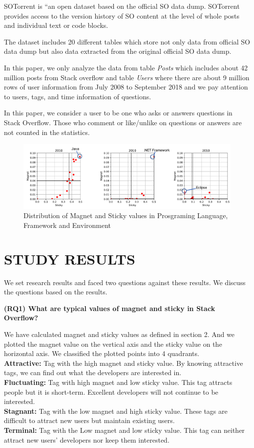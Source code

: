 \documentclass[conference]{IEEEtran}
\begin{document}
SOTorrent is “an open dataset based on the official SO data dump. SOTorrent provides access to the version history of SO content at the level of whole posts and individual text or code blocks.

The dataset includes 20 different tables which store not only data from official SO data dump but also data extracted from the original official SO data dump.

In this paper, we only analyze the data from table \emph{Posts} which includes about 42 million posts from Stack overflow and table \emph{Users} where there are about 9 million rows of user information from July 2008 to September 2018 and we pay attention to users, tags, and time information of questions.

In this paper, we consider a user to be one who asks or answers questions in Stack Overflow. Those who comment or like/unlike on questions or answers are not counted in the statistics.

\begin{figure}[t]
 \centering
 \includegraphics[width=0.7\hsize]{img/2010all.pdf}  
 \caption{Distribution of Magnet and Sticky values in Prosgraming Language, Framework and Environment} 
 \label{fig:2010} 
\end{figure}
\smallskip

\smallskip
\smallskip



\section{STUDY RESULTS} %
We set research results and faced two questions against these results. We discuss the questions based on the results.
\smallskip
\smallskip

\textbf{(RQ1) What are typical values of magnet and sticky in Stack Overflow?}
\smallskip

We have calculated magnet and sticky values as defined in section 2. And we plotted the magnet value on the vertical axis and the sticky value on the horizontal axis. We classified the plotted points into 4 quadrants.\\
\textbf
{Attractive:} Tag with the high magnet and sticky value. By knowing attractive tags, we can find out what the developers are interested in.\\
\textbf{Fluctuating:} Tag with high magnet and low sticky value. This tag attracts people but it is short-term. Excellent developers will not continue to be interested.\\
\textbf{Stagnant:} Tag with the low magnet and high sticky value. These tags are difficult to attract new users but maintain existing users.\\
\textbf{Terminal:} Tag with the Low magnet and low sticky value. This tag can neither attract new users' developers nor keep them interested.
\smallskip
\smallskip
\end{document}
